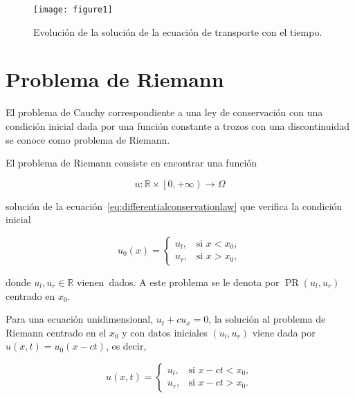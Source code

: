 \begin{figure}[ht!]
  \centering
  \texttt{[image: figure1]}
  \caption{
    Evolución de la solución de la ecuación de transporte con el
    tiempo.
  }
  \label{fig:1}
\end{figure}

\section{Problema de Riemann}

El problema de Cauchy correspondiente a una ley de conservación con
una condición inicial dada por una función constante a trozos con una
discontinuidad se conoce como problema de Riemann.

\begin{definition}
  El problema de Riemann consiste en encontrar una función

  \begin{equation*}
    u\colon\mathbb{R}\times
    \left[0,+\infty\right)\longrightarrow
    \Omega
  \end{equation*}

  solución de la ecuación~\eqref{eq:differentialconservationlaw} que
  verifica la condición inicial

  \begin{equation*}
    u_{0}\left(x\right)=
    \begin{cases}
      u_{l}, &
      \text{si } x<x_{0}, \\
      u_{r}, &
      \text{si } x>x_{0},
    \end{cases}
  \end{equation*}

  donde $u_{l},u_{r}\in\mathbb{R}$ vienen~dados.
  A este problema se le denota por
  $\operatorname{PR}\left(u_{l},u_{r}\right)$ centrado en $x_{0}$.
\end{definition}

Para una ecuación unidimensional, $u_{t}+cu_{x}=0$, la solución al
problema de Riemann centrado en el $x_{0}$ y con datos iniciales
$\left(u_{l},u_{r}\right)$ viene dada por
$u\left(x,t\right)=u_{0}\left(x-ct\right)$, es decir,

\begin{equation*}
  u
  \left(x,t\right)=
  \begin{cases}
    u_{l}, &
    \text{si } x-ct<x_{0}, \\
    u_{r}, &
    \text{si } x-ct>x_{0}.
  \end{cases}
\end{equation*}
